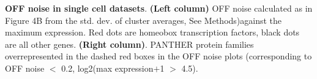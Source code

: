 \textbf{OFF noise in single cell datasets}. \textbf{(Left column)} OFF noise calculated as in Figure 4B from the std. dev. of cluster averages, See Methods)against the maximum expression. Red dots are homeobox transcription factors, black dots are all other genes. \textbf{(Right column)}. PANTHER protein families overrepresented in the dashed red boxes in the OFF noise plots (corresponding to OFF noise $<$ 0.2, log2(max expression$+$1 $>$ 4.5).